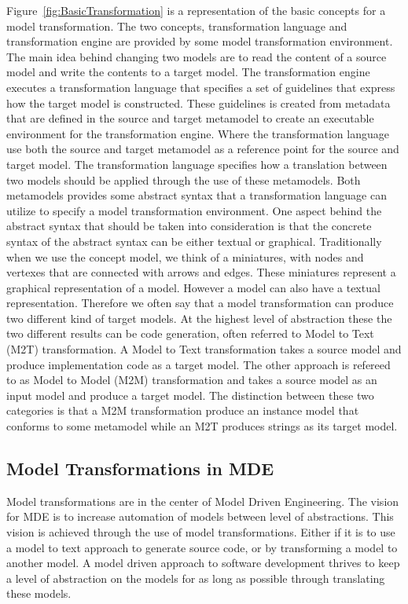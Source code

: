 Figure~\ref{fig:BasicTransformation} is a representation of the basic concepts
for a model transformation. The two concepts, transformation language and
transformation engine are provided by some model transformation environment.
The main idea behind changing two models are to read the content of a source
model and write the contents to a target model. The transformation engine
executes a transformation language that specifies a set of guidelines that
express how the target model is constructed. These guidelines is created from
metadata that are defined in the source and target metamodel to create an
executable environment for the transformation engine. Where the transformation
language use both the source and target metamodel as a reference point for the
source and target model. The transformation language specifies how a
translation between two models should be applied through the use of these
metamodels. Both metamodels provides some abstract syntax that a transformation
language can utilize to specify a model transformation environment. One aspect
behind the abstract syntax that should be taken into consideration is that the
concrete syntax of the abstract syntax can be either textual or graphical.
Traditionally when we use the concept model, we think of a miniatures, with
nodes and vertexes that are connected with arrows and edges. These miniatures
represent a graphical representation of a model. However a model can also have a
textual representation. Therefore we often say that a model transformation
can produce two different kind of target models. At the highest level of
abstraction these the two different results can be code generation, often
referred to Model to Text (M2T) transformation. A Model to Text transformation
takes a source model and produce implementation code as a target model. The
other approach is refereed to as Model to Model (M2M) transformation and takes a
source model as an input model and produce a target model. The distinction
between these two categories is that a M2M transformation produce an instance
model that conforms to some metamodel while an M2T produces strings as its
target model. 

\subsection{Model Transformations in MDE}

Model transformations are in the center of Model Driven Engineering.
The vision for MDE is to increase automation of models between level of
abstractions. This vision is achieved through the use of model transformations.
Either if it is to use a model to text approach to generate source code, or by
transforming a model to another model. A model driven approach to software
development thrives to keep a level of abstraction on the models for as long as
possible through translating these models.  


